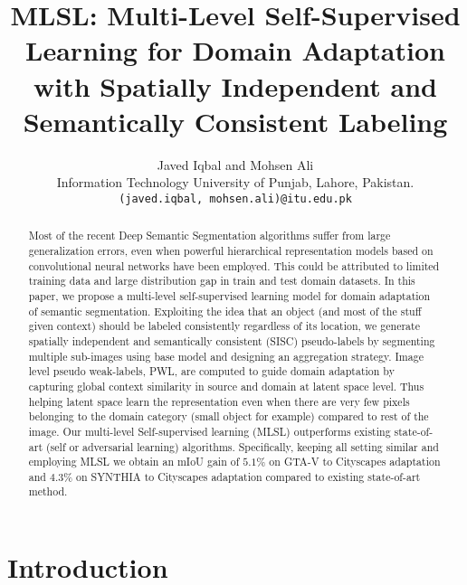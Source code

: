 \documentclass[10pt,twocolumn,letterpaper]{article}
\begin{document}
\title{MLSL: Multi-Level Self-Supervised Learning for Domain Adaptation with Spatially Independent and Semantically Consistent Labeling}

\author{Javed Iqbal and Mohsen Ali \\
Information Technology University of Punjab, Lahore, Pakistan.\\
{\tt\small (javed.iqbal, mohsen.ali)@itu.edu.pk}
}



\maketitle
\ifwacvfinal\thispagestyle{empty}\fi

\begin{abstract}
Most of the recent Deep Semantic Segmentation algorithms suffer from large generalization errors, even when powerful hierarchical representation models based on convolutional neural networks have been employed.  
This could be attributed to limited training data and large distribution gap in train and test domain datasets.
In this paper, we propose a multi-level self-supervised learning model for domain adaptation of semantic segmentation.  
Exploiting the idea that an object (and most of the stuff given context) should be labeled consistently regardless of its location, we generate spatially independent and semantically consistent (SISC) pseudo-labels by segmenting multiple sub-images using base model and designing an aggregation strategy.
Image level pseudo weak-labels, PWL, are computed to guide domain adaptation by capturing global context similarity in source and domain at latent space level. Thus helping latent space learn the representation even when there are very few pixels belonging to the domain category (small object for example) compared to rest of the image.   
Our multi-level Self-supervised learning (MLSL) outperforms existing state-of-art (self or adversarial learning) algorithms. Specifically, keeping all setting similar and employing MLSL we obtain an mIoU gain of $5.1\%$ on GTA-V to Cityscapes adaptation and $4.3\%$ on SYNTHIA to Cityscapes adaptation compared to existing state-of-art method.


\end{abstract}
\vspace{-0.4cm}
\section{Introduction}
\vspace{-0.2cm}
\label{sec:intro}
\end{document}
